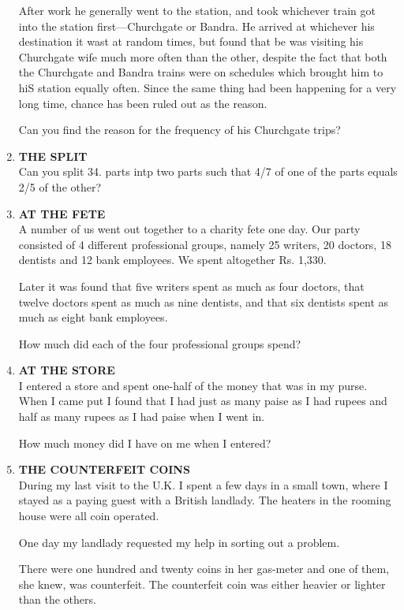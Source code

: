 \documentclass[12pt]{article}
\begin{document}
\begin{enumerate}
After  work  he generally  went  to the station,  and took whichever  train  got into  the station  first—Churchgate  or Bandra.  He  arrived  at whichever  his destination  it wast at random  times,  but  found  that  be was  visiting  his Churchgate  wife  much  more  often  than  the other,  despite the fact  that both  the Churchgate  and  Bandra  trains  were on schedules  which  brought  him  to hiS  station  equally often.  Since  the same  thing  had  been  happening  for a very long  time,  chance  has  been  ruled  out  as the reason. 

Can you  find  the  reason  for  the  frequency  of his Churchgate  trips? 
%
\item \textbf{THE  SPLIT} \\
Can you split  34. parts  intp  two parts  such  that 4/7 of one 
of the parts  equals 2/5 of  the other? 
%
\item \textbf{AT  THE  FETE} \\
A number  of us went  out together  to a charity  fete  one day. Our  party  consisted  of 4 different  professional groups,  namely  25 writers,  20 doctors,  18 dentists  and  12 bank  employees.  We  spent  altogether  Rs. 1,330. 

Later  it was  found  that  five writers  spent  as much  as four doctors,  that twelve  doctors  spent  as much  as nine dentists,  and  that  six dentists  spent  as much  as eight  bank employees. 

How  much  did  each  of the four  professional  groups spend? 
%
\item \textbf{AT THE  STORE} \\
I entered  a store  and spent  one-half  of the money  that  was in my  purse.  When  I came  put I found  that  I had  just as many  paise  as I had rupees  and half  as many  rupees  as I had paise  when  I went  in. 

How  much  money  did I have  on me when  I entered? 
%
\item \textbf{THE  COUNTERFEIT  COINS} \\ 
During  my last visit  to the U.K.  I spent  a few  days  in a small  town,  where  I stayed  as a paying  guest  with  a British landlady.  The  heaters  in the  rooming  house  were  all coin operated. 

One day my landlady  requested  my help  in sorting  out a problem. 

There  were  one  hundred  and  twenty  coins  in her gas-meter  and one of them,  she knew,  was  counterfeit.  The counterfeit  coin  was  either  heavier  or lighter  than  the others.


\end{enumerate}
\end{document}
